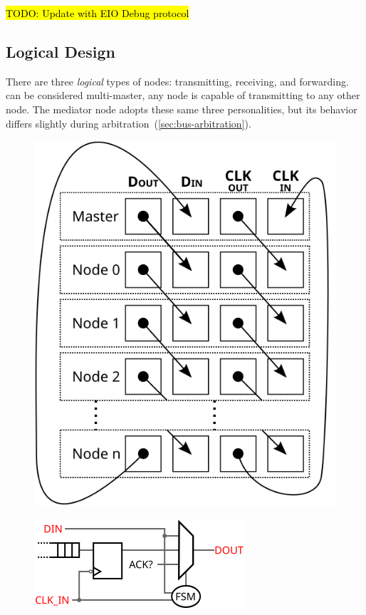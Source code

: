 \hl{TODO: Update with EIO Debug protocol}


\subsection{Logical Design}
\label{sec:logical}

There are three {\em logical} types of \bus nodes: transmitting, receiving,
and forwarding. \bus can be considered multi-master, any node is capable of
transmitting to any other node. The mediator node adopts these same three
personalities, but its behavior differs slightly during
arbitration~(\ref{sec:bus-arbitration}).

\begin{figure}
  \begin{minipage}[b]{.48\linewidth}
    \centering
    \includegraphics[width=0.5\linewidth]{img/stacked_layers}
    \label{fig:physical-topology}
  \end{minipage}
  \hspace{1 em}
  \begin{minipage}[b]{.48\linewidth}
    \centering
    \includegraphics[width=\textwidth]{img/logical}

\end{minipage}
\end{figure}
